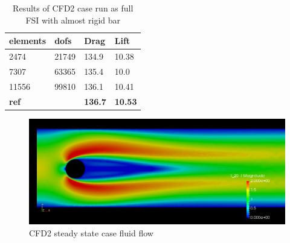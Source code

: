 \begin{table}[H]
\centering
\caption{Results of CFD2 case run as full FSI with almost rigid bar}
\label{my-label}
\begin{tabular}{|l|l|l|l|}
\hline
\textbf{elements} & \textbf{dofs} & \textbf{Drag} & \textbf{Lift} \\ \hline
2474 & 21749 & 134.9 & 10.38 \\ \hline
7307 & 63365 & 135.4 & 10.0 \\ \hline
11556 & 99810 & 136.1 & 10.41 \\ \hline
\textbf{ref} & \textbf{} & \textbf{136.7} & \textbf{10.53} \\ \hline
\end{tabular}
\end{table}

\begin{figure}[H]
\label{fig:CFD2}
\includegraphics[scale=0.45, trim={9mm 0mm 0mm 10mm},clip]{./Verification_Validation/Hron_Turek/CFD2.png}
\caption{CFD2 steady state case fluid flow}
\end{figure}

